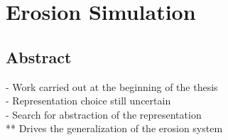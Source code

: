 \part{Erosion Simulation}

\chapter*{Abstract}
- Work carried out at the beginning of the thesis \\
- Representation choice still uncertain \\
- Search for abstraction of the representation \\
** Drives the generalization of the erosion system




%